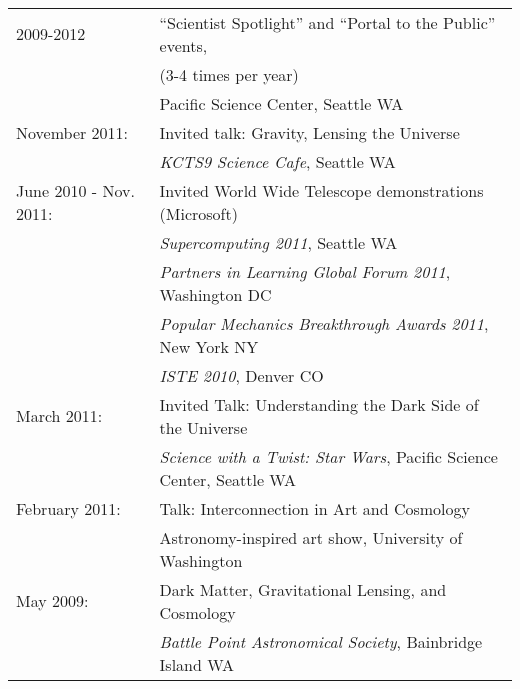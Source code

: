 {\\
\begin{tabular}{ll}
  2009-2012      & ``Scientist Spotlight'' and ``Portal to the Public''
                    events,\\ & (3-4 times per year)\\
                 & \hspace{1cm} Pacific Science Center, Seattle WA\\
  November 2011: & Invited talk: Gravity, Lensing the Universe\\
                 & \hspace{1cm}  {\it KCTS9 Science Cafe}, Seattle WA\\
  June 2010 - Nov. 2011: & Invited World Wide Telescope demonstrations
                           (Microsoft)\\
                 & \hspace{1cm} {\it Supercomputing 2011}, Seattle WA\\
                 & \hspace{1cm} {\it Partners in Learning Global Forum 2011},
                    Washington DC\\
                 & \hspace{1cm} {\it Popular Mechanics Breakthrough Awards
                    2011}, New York NY\\
                 & \hspace{1cm} {\it ISTE 2010}, Denver CO\\
  March 2011:    & Invited Talk: Understanding the Dark Side of the Universe\\
                 & \hspace{1cm} {\it Science with a Twist: Star Wars},
                   Pacific Science Center, Seattle WA\\
  February 2011: & Talk: Interconnection in Art and Cosmology\\
                 & \hspace{1cm} Astronomy-inspired art show,
                   University of Washington\\
  May 2009:      & Dark Matter, Gravitational Lensing, and Cosmology\\
                 & \hspace{1cm} {\it Battle Point Astronomical Society},
                   Bainbridge Island WA
\end{tabular}\\

}
